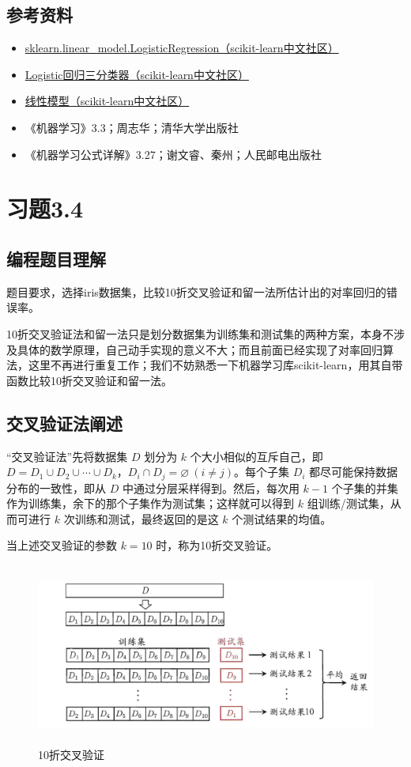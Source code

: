 \documentclass{ctexart}
\begin{document}
	\subsection{参考资料}   
	\begin{itemize}
		\item \href{https://scikit-learn.org.cn/view/378.html}{sklearn.linear\_model.LogisticRegression（scikit-learn中文社区）}
		\item\href{https://scikit-learn.org.cn/view/228.html}{Logistic回归三分类器（scikit-learn中文社区）}
		\item\href{https://scikit-learn.org.cn/view/4.html#1.1.11%20Logistic%E5%9B%9E%E5%BD%92}{线性模型（scikit-learn中文社区）}
		\item 《机器学习》3.3；周志华；清华大学出版社
		\item 《机器学习公式详解》3.27；谢文睿、秦州；人民邮电出版社
	\end{itemize}
	\section{习题3.4}
	\subsection{编程题目理解}
	题目要求，选择iris数据集，比较10折交叉验证和留一法所估计出的对率回归的错误率。
	
	10折交叉验证法和留一法只是划分数据集为训练集和测试集的两种方案，本身不涉及具体的数学原理，自己动手实现的意义不大；而且前面已经实现了对率回归算法，这里不再进行重复工作；我们不妨熟悉一下机器学习库scikit-learn，用其自带函数比较10折交叉验证和留一法。
	
	\subsection{交叉验证法阐述}
	“交叉验证法”先将数据集 $D$ 划分为 $k$ 个大小相似的互斥自己，即 $D=D_1\cup D_2\cup \cdots \cup D_k$，$D_i\cap D_j=\varnothing\ (i\neq j)$。每个子集 $D_i$ 都尽可能保持数据分布的一致性，即从 $D$ 中通过分层采样得到。然后，每次用 $k-1$ 个子集的并集作为训练集，余下的那个子集作为测试集；这样就可以得到 $k$ 组训练/测试集，从而可进行 $k$ 次训练和测试，最终返回的是这 $k$ 个测试结果的均值。
	
	当上述交叉验证的参数 $k=10$ 时，称为10折交叉验证。
	
	\begin{figure}[hbt]
		\centering
		\includegraphics[scale=1,height=6cm]{../image/10折交叉验证.png}
		\caption{10折交叉验证}
	\end{figure}
\end{document}
